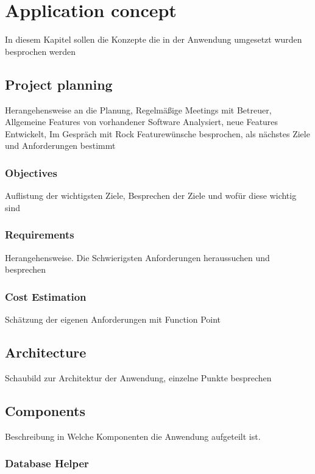 \chapter{Application concept}

In diesem Kapitel sollen die Konzepte die in der Anwendung umgesetzt wurden besprochen werden


\section{Project planning}

Herangehensweise an die Planung, Regelmäßige Meetings mit Betreuer, Allgemeine Features von vorhandener Software Analysiert, neue Features Entwickelt, Im Gespräch mit Rock Featurewünsche besprochen, als nächstes Ziele und Anforderungen bestimmt

\subsection{Objectives}

Auflistung der wichtigsten Ziele, Besprechen der Ziele und wofür diese wichtig sind

\subsection{Requirements}

Herangehensweise. 
Die Schwierigsten Anforderungen heraussuchen und besprechen

\subsection{Cost Estimation}

Schätzung der eigenen Anforderungen mit Function Point

\section{Architecture}

Schaubild zur Architektur der Anwendung, einzelne Punkte besprechen

\section{Components}

Beschreibung in Welche Komponenten die Anwendung aufgeteilt ist.

\subsection{Database Helper}

